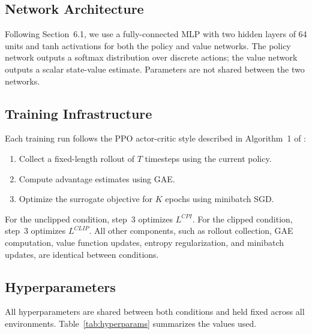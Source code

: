 \documentclass{article}
\begin{document}
\subsection{Network Architecture}

Following \citep{schulman2017ppo} Section~6.1, we use a fully-connected MLP with two hidden layers of 64 units and tanh activations for both the policy and value networks. The policy network outputs a softmax distribution over discrete actions; the value network outputs a scalar state-value estimate. Parameters are not shared between the two networks.

\subsection{Training Infrastructure}

Each training run follows the PPO actor-critic style described in Algorithm~1 of
\citet{schulman2017ppo}:
\begin{enumerate}
    \item Collect a fixed-length rollout of $T$ timesteps using the current policy.
    \item Compute advantage estimates using GAE.
    \item Optimize the surrogate objective for $K$ epochs using minibatch SGD.
\end{enumerate}
For the unclipped condition, step~3 optimizes $L^{CPI}$. For the clipped condition, step~3 optimizes $L^{CLIP}$. All other components, such as rollout collection, GAE computation, value function updates, entropy regularization, and minibatch updates, are identical between conditions.

\subsection{Hyperparameters}

All hyperparameters are shared between both conditions and held fixed across all environments. Table~\ref{tab:hyperparams} summarizes the values used.
\end{document}
